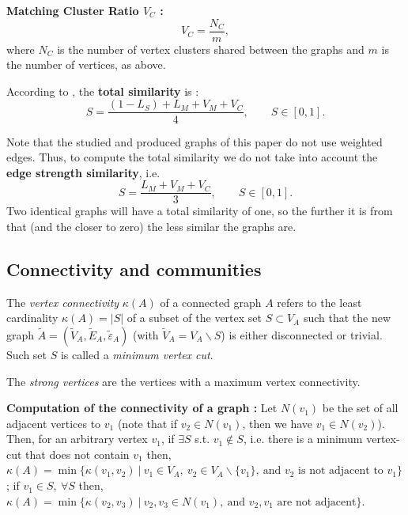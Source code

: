 \documentclass[english, 12pt]{article}
\begin{document}
{\bf Matching Cluster Ratio $V_C$ :}
\[V_C = \frac{N_C}{m},\]
where $N_C$ is the number of vertex clusters shared between the graphs and $m$ is the number of vertices, as above.

According to \cite{2019osti}, the {\bf total similarity} is :
$$S = \dfrac{(1-L_S) + L_M + V_M + V_C}{4},\qquad S \in [0,1].$$

Note that the studied and produced graphs of this paper do not use weighted edges. Thus, to compute the total similarity we do not take into account the {\bf edge strength similarity},
i.e.
$$S = \dfrac{L_M + V_M + V_C}{3},\qquad S \in [0,1].$$
Two identical graphs will have a total similarity of one, so the further it is from that (and the closer to zero) the less similar the graphs are.

\subsection{Connectivity and communities}

The {\it vertex connectivity} $\kappa(A)$ of a connected graph $A$ refers to the least cardinality $\kappa(A) = |S|$ of a subset of the vertex set $S \subset V_A$ such that the new graph $\tilde A = (\tilde V_A, \tilde E_A, \tilde \varepsilon_A)$ (with $\tilde V_A = V_A \backslash S$) is either disconnected or trivial.
Such set $S$ is called a {\it minimum vertex cut}.

The {\it strong vertices} are the vertices with a maximum vertex connectivity.

{\bf Computation of the connectivity of a graph :}
Let $N(v_1)$ be the set of all adjacent vertices to $v_1$ (note that if $v_2\in N(v_1)$, then we have $v_1 \in N(v_2)$). Then, for an arbitrary vertex $v_1$, if $\exists S$ s.t. $v_1 \not\in S$, i.e. there is a minimum vertex-cut that does not contain $v_1$ then, 
$\kappa(A) = \min\big\{\kappa(v_1,v_2) \:|\: v_1 \in V_A,\: v_2 \in V_A\backslash\{v_1\},\: \text{and $v_2$ is not adjacent to $v_1$}\big\}$;
if $v_1 \in S,\: \forall S$ then, 
$\kappa(A) = \min\big\{\kappa(v_2,v_3) \:|\: v_2,v_3 \in N(v_1),\:\text{and $v_2,v_1$ are not adjacent}\big\}$.

\end{document}

